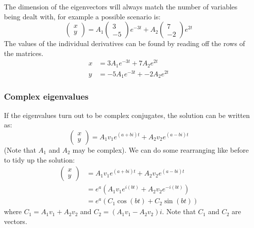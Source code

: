 \documentclass{scrartcl}
\begin{document}
The dimension of the eigenvectors will always match the number of variables being dealt with, for example a possible scenario is:
\begin{equation}
\begin{pmatrix}
x \\
y
\end{pmatrix}
= A_{1}
\begin{pmatrix}
3 \\
-5
\end{pmatrix}
e^{-3t} + A_{2}
\begin{pmatrix}
7 \\
-2
\end{pmatrix}
e^{2t}
\end{equation}
The values of the individual derivatives can be found by reading off the rows of the matrices.
\begin{equation}
\begin{split}
x & = 3A_{1}e^{-3t} + 7A_{2}e^{2t} \\
y & = -5A_{1}e^{-3t} + -2A_{2}e^{2t}
\end{split}
\end{equation}

\subsubsection*{Complex eigenvalues}
If the eigenvalues turn out to be complex conjugates, the solution can be written as:
\begin{equation}
\begin{pmatrix}
x \\
y
\end{pmatrix}
= A_{1}v_{1}e^{(a + bi)t} + A_{2}v_{2}e^{(a - bi)t}
\end{equation}
(Note that $ A_{1} $ and $ A_{2} $ may be complex). We can do some rearranging like before to tidy up the solution:
\begin{equation}
\begin{split}
\begin{pmatrix}
x \\
y
\end{pmatrix}
& = A_{1}v_{1}e^{(a + bi)t} + A_{2}v_{2}e^{(a - bi)t} \\
& = e^{a}(A_{1}v_{1}e^{i(bt)} + A_{2}v_{2}e^{- i(bt)}) \\
& = e^{a}(C_{1}\cos(bt) + C_{2}\sin(bt))
\end{split}
\end{equation}
where $ C_{1} = A_{1}v_{1} + A_{2}v_{2} $ and $ C_{2} = (A_{1}v_{1} - A_{2}v_{2})i $. Note that $ C_{1} $ and $ C_{2} $ are vectors.
\end{document}
